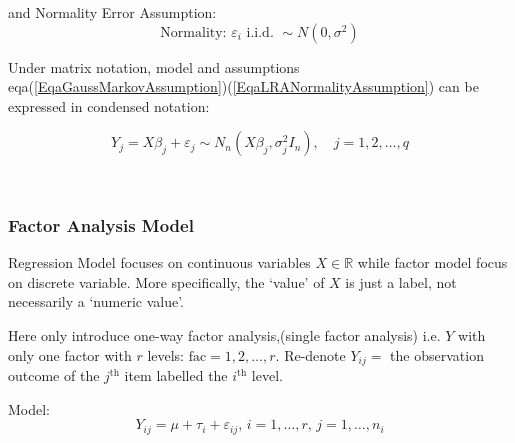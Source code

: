 and Normality Error Assumption: 
\begin{equation}\label{EqaLRANormalityAssumption}
    \text{Normality: }\varepsilon _i \text{ i.i.d. }\sim N(0,\sigma ^2) 
\end{equation}

    Under matrix notation, model and assumptions eqa(\ref{EqaGaussMarkovAssumption})(\ref{EqaLRANormalityAssumption}) can be expressed in condensed notation:

    \begin{equation}
        Y_j=X\beta_j +\varepsilon_j  \sim N_n(X\beta_j ,\sigma_j^2I_n),\quad j=1,2,\ldots,q
    \end{equation}

\\


\subsubsection{Factor Analysis Model}
    Regression Model focuses on continuous variables $ X\in\mathbb{R} $ while factor model focus on discrete variable. More specifically, the `value' of $ X $ is just a label, not necessarily a `numeric value'.

    Here only introduce one-way factor analysis,(single factor analysis) i.e. $ Y $ with only one factor with $ r $ levels: $ \mathrm{fac} =1,2,\ldots,r $. Re-denote $ Y_{ij}= $ the observation outcome of the $ j^\mathrm{th}  $ item labelled the $ i^\mathrm{th}  $ level.

    Model:
    \[
        Y_{ij}=\mu +\tau_i+\varepsilon _{ij} ,\, i=1,\ldots,r,\, j=1,\ldots,n_i
    \]
    
